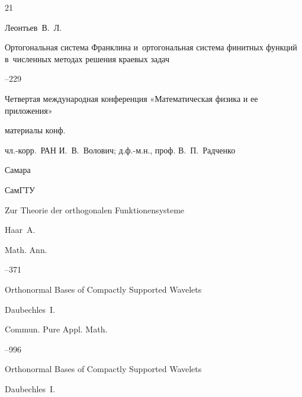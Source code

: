 \RusRef







\begin{thebibliography}{21}




\by Леонтьев~В.~Л.

\paper Ортогональная система Франклина и~ортогональная система финитных функций в~численных методах решения краевых задач

--229

\inbook Четвертая международная конференция «Математическая физика и ее приложения»

\bookinfo материалы конф. 

\eds чл.-корр.~РАН И.~В.~Волович; д.ф.-м.н., проф. В.~П.~Радченко

\publaddr Самара

\publ СамГТУ







\paper  Zur Theorie der orthogonalen Funktionensysteme 

\by Haar~A.

\jour Math. Ann. 



--371






\paper  Orthonormal Bases of Compactly Supported Wavelets 

\by Daubechles~I.

\jour Commun. Pure Appl. Math. 




--996


\moreref

\paper  Orthonormal Bases of Compactly Supported Wavelets 

\by Daubechles~I.


\end{thebibliography}
